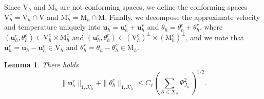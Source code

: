 \documentclass[10pt,a4paper]{article}
\newtheorem{lemma} {\bf Lemma}
\begin{document}
Since $\mathrm{V}_h$ and $\mathrm{M}_h$ are not conforming spaces, we define the conforming spaces $\mathrm{V}_h^c = \mathrm{V}_h \cap \mathrm{V}$ and $\mathrm{M}_h^c = \mathrm{M}_h \cap \mathrm{M}$. Finally, we decompose the approximate velocity and temperature  uniquely into $\boldsymbol{u}_h = \boldsymbol{u}_h^c + \boldsymbol{u}_h^r $ and $\theta_h = \theta_h^c + \theta_h^r $, where $(\boldsymbol{u}_h^c, \theta_h^c) \in \mathrm{V}_h^c \times \mathrm{M}_h^c  $ and $(\boldsymbol{u}_h^r, \theta_h^r)  \in (\mathrm{V}_h^c)^{\perp} \times (\mathrm{M}_h^c)^{\perp} $, and we note that $ \boldsymbol{u}_h^r = \boldsymbol{u}_h - \boldsymbol{u}_h^c \in \mathrm{V}_h $ and $\theta_h^r = \theta_h - \theta_h^c \in \mathrm{M}_h$.
 \begin{lemma}\label{SRL1}
     There holds 
     $$
   \| \boldsymbol{u}_h^r\|_{1,\mathcal{K}_h}+  \| \theta_h^r\|_{1,\mathcal{K}_h} \leq C_r \left( \sum_{K \in \mathcal{K}_h}  \Psi_{J_K}^2 \right)^{1/2}.
     $$
 \end{lemma}
\end{document}
